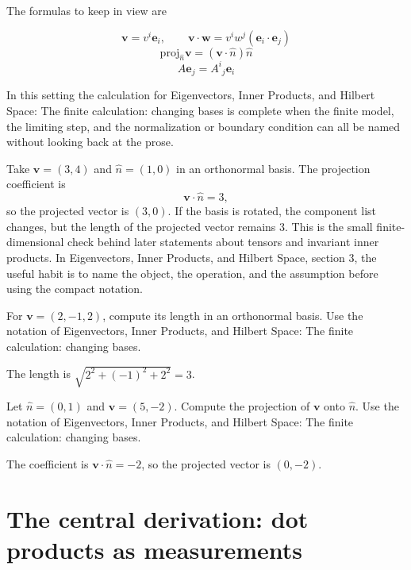 The formulas to keep in view are

\[
  \bm v=v^i\bm e_i,\qquad \bm v\cdot\bm w=v^iw^j(\bm e_i\cdot\bm e_j)
\]
\[
  \mathrm{proj}_{\hat n}\bm v=(\bm v\cdot\hat n)\hat n
\]
\[
  A\bm e_j=A^i{}_j\bm e_i
\]

In this setting the calculation for Eigenvectors, Inner Products, and Hilbert Space: The finite calculation: changing bases is complete when the finite model, the limiting step, and the normalization or boundary condition can all be named without looking back at the prose.




\begin{example}
Take \(\bm v=(3,4)\) and \(\hat n=(1,0)\) in an orthonormal basis.  The projection coefficient is
\[
  \bm v\cdot\hat n=3,
\]
so the projected vector is \((3,0)\).  If the basis is rotated, the component list changes, but the length of the projected vector remains \(3\).  This is the small finite-dimensional check behind later statements about tensors and invariant inner products.  In Eigenvectors, Inner Products, and Hilbert Space, section 3, the useful habit is to name the object, the operation, and the assumption before using the compact notation.
\end{example}



\begin{exercise}
For \(\bm v=(2,-1,2)\), compute its length in an orthonormal basis.  Use the notation of Eigenvectors, Inner Products, and Hilbert Space: The finite calculation: changing bases.
\begin{answer}
The length is \(\sqrt{2^2+(-1)^2+2^2}=3\).
\end{answer}
\end{exercise}

\begin{exercise}
Let \(\hat n=(0,1)\) and \(\bm v=(5,-2)\).  Compute the projection of \(\bm v\) onto \(\hat n\).  Use the notation of Eigenvectors, Inner Products, and Hilbert Space: The finite calculation: changing bases.
\begin{answer}
The coefficient is \(\bm v\cdot\hat n=-2\), so the projected vector is \((0,-2)\).
\end{answer}
\end{exercise}



\section{The central derivation: dot products as measurements}

